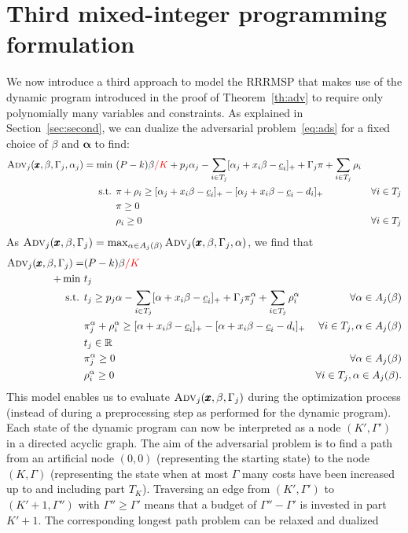 \documentclass[a4paper,11pt,abstracton]{scrartcl}
\theoremstyle{definition}
\theoremstyle{remark}
\newcommand{\rr}{\mathbb{R}}
\newcommand{\lasse}[1]{\textcolor{red}{#1}}
\begin{document}
\section{Third mixed-integer programming formulation}
\label{sec:compact}

We now introduce a third approach to model the RRRMSP that makes use of the dynamic program introduced in the proof of Theorem~\ref{th:adv} to require only polynomially many variables and constraints.
As explained in Section~\ref{sec:second}, we can dualize the adversarial problem~\eqref{eq:ads} for a fixed choice of $\beta$ and $\pmb{\alpha}$ to find:
\begin{align*}
\textsc{Adv}_j(\pmb{x},\beta,\Gamma_j,\alpha_j) = \min\ &(P-k)\beta\lasse{/K} + p_j\alpha_j - \sum_{i\in T_j} [\alpha_j + x_i\beta - \underline{c}_i]_+ + \Gamma_j \pi + \sum_{i\in T_j} \rho_i \\
\text{s.t. } & \pi + \rho_i \ge [\alpha_j + x_i\beta - \underline{c}_i]_+ - [\alpha_j + x_i \beta - \underline{c}_i - d_i]_+ & \forall i\in T_j \\
& \pi \ge 0 \\
& \rho_i \ge 0 & \forall i\in T_j
\end{align*}
As $\textsc{Adv}_j(\pmb{x},\beta,\Gamma_j) = \max_{\alpha\in A_j(\beta)} \textsc{Adv}_j(\pmb{x},\beta,\Gamma_j,\alpha)$, we find that
\begin{align*}
\textsc{Adv}_j(\pmb{x},\beta,\Gamma_j) = &(P-k)\beta\lasse{/K} \\
+ \min\ & t_j \\
\text{s.t. } & t_j \ge p_j \alpha - \sum_{i\in T_j} [\alpha + x_i\beta - \underline{c}_i]_+ + \Gamma_j \pi_j^\alpha + \sum_{i\in T_j} \rho_i^\alpha & \forall \alpha \in A_j(\beta) \\
& \pi_j^\alpha + \rho_i^\alpha \ge [\alpha + x_i\beta - \underline{c}_i]_+ - [\alpha + x_i \beta - \underline{c}_i - d_i]_+ & \forall i\in T_j, \alpha\in A_j(\beta)\\
& t_j \in \rr \\
& \pi_j^\alpha \ge 0 & \forall \alpha\in A_j(\beta) \\
& \rho_i^\alpha \ge 0 & \forall i\in T_j , \alpha\in A_j(\beta).
\end{align*}
This model enables us to evaluate $\textsc{Adv}_j(\pmb{x},\beta,\Gamma_j)$ during the optimization process (instead of during a preprocessing step as performed for the dynamic program). Each state of the dynamic program can now be interpreted as a node $(K',\Gamma')$ in a directed acyclic graph. The aim of the adversarial problem is to find a path from an artificial node $(0,0)$ (representing the starting state) to the node $(K,\Gamma)$ (representing the state when at most $\Gamma$ many costs have been increased up to and including part $T_K$). Traversing an edge from $(K',\Gamma')$ to $(K'+1,\Gamma'')$ with $\Gamma''\ge \Gamma'$ means that a budget of $\Gamma''-\Gamma'$ is invested in part $K'+1$. The corresponding longest path problem can be relaxed and dualized 
\end{document}
